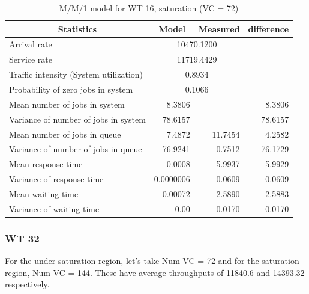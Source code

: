 \documentclass[11pt,a4paper]{article}
\begin{document}
\begin{table}[htbp]
	\centering
	\caption{M/M/1 model for WT 16, saturation (VC = 72)}
	\begin{tabular}{|l|r|l|r|}
		\hline
		\multicolumn{1}{|c|}{Statistics} & \multicolumn{1}{c|}{Model} & \multicolumn{1}{c|}{Measured} & \multicolumn{1}{c|}{difference} \\ \hline
		Arrival rate & \multicolumn{ 2}{c|}{10470.1200} & \multicolumn{1}{l|}{} \\ \hline
		Service rate & \multicolumn{ 2}{c|}{11719.4429} & \multicolumn{1}{l|}{} \\ \hline
		Traffic intensity (System utilization) & \multicolumn{ 2}{c|}{0.8934} & \multicolumn{1}{l|}{} \\ \hline
		Probability of zero jobs in system & \multicolumn{ 2}{c|}{0.1066} & \multicolumn{1}{l|}{} \\ \hline
		Mean number of jobs in system & 8.3806 &  & 8.3806 \\ \hline
		Variance of number of jobs in system & 78.6157 &  & 78.6157 \\ \hline
		Mean number of jobs in queue & 7.4872 & \multicolumn{1}{r|}{11.7454} & 4.2582 \\ \hline
		Variance of number of jobs in queue & 76.9241 & \multicolumn{1}{r|}{0.7512} & 76.1729 \\ \hline
		Mean response time & 0.0008 & \multicolumn{1}{r|}{5.9937} & 5.9929 \\ \hline
		Variance of response time & 0.0000006 & \multicolumn{1}{r|}{0.0609} & 0.0609 \\ \hline
		Mean waiting time & 0.00072 & \multicolumn{1}{r|}{2.5890} & 2.5883 \\ \hline
		Variance of waiting time & 0.00 & \multicolumn{1}{r|}{0.0170} & 0.0170 \\ \hline
	\end{tabular}
	\label{}
\end{table}



\subsubsection{WT 32}
For the under-saturation region, let's take Num VC = 72 and for the saturation region, Num VC = 144. These have average throughputs of 11840.6 and 14393.32 respectively.
\end{document}
